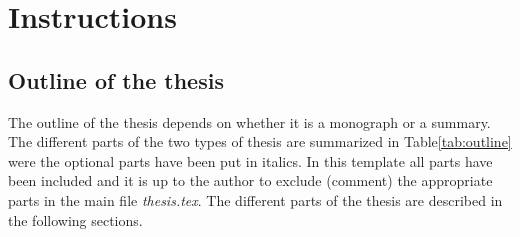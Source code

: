 

\graphicspath{{1_introduction/figures/}} %


\chapter{Instructions} %

\section{Outline of the thesis \label{layout}}

The outline of the thesis depends on whether it is a monograph or a summary. The different parts of the two types of thesis are summarized in Table\ref{tab:outline} were the optional parts have been put in italics. In this template all parts have been included and it is up to the author to exclude (comment) the appropriate parts in the main file \emph{thesis.tex}. The different parts of the thesis are described in the following sections.

